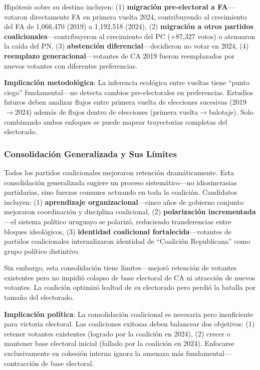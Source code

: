 Hipótesis sobre su destino incluyen: (1) \textbf{migración pre-electoral a FA}---votaron directamente FA en primera vuelta 2024, contribuyendo al crecimiento del FA de 1,066,470 (2019) a 1,192,518 (2024), (2) \textbf{migración a otros partidos coalicionales}---contribuyeron al crecimiento del PC (+87,327 votos) o atenuaron la caída del PN, (3) \textbf{abstención diferencial}---decidieron no votar en 2024, (4) \textbf{reemplazo generacional}---votantes de CA 2019 fueron reemplazados por nuevos votantes con diferentes preferencias.

\textbf{Implicación metodológica}: La inferencia ecológica entre vueltas tiene ``punto ciego'' fundamental---no detecta cambios pre-electorales en preferencias. Estudios futuros deben analizar flujos entre primera vuelta de elecciones sucesivas (2019$\to$2024) además de flujos dentro de elecciones (primera vuelta$\to$balotaje). Solo combinando ambos enfoques se puede mapear trayectorias completas del electorado.

\subsubsection{Consolidación Generalizada y Sus Límites}

Todos los partidos coalicionales mejoraron retención dramáticamente. Esta consolidación generalizada sugiere un proceso sistemático---no idiosincrasias partidarias, sino fuerzas comunes actuando en toda la coalición. Candidatos incluyen: (1) \textbf{aprendizaje organizacional}---cinco años de gobierno conjunto mejoraron coordinación y disciplina coalicional, (2) \textbf{polarización incrementada}---el sistema político uruguayo se polarizó, reduciendo transferencias entre bloques ideológicos, (3) \textbf{identidad coalicional fortalecida}---votantes de partidos coalicionales internalizaron identidad de ``Coalición Republicana'' como grupo político distintivo.

Sin embargo, esta consolidación tiene límites---mejoró retención de votantes existentes pero no impidió colapso de base electoral de CA ni atracción de nuevos votantes. La coalición optimizó lealtad de su electorado pero perdió la batalla por tamaño del electorado.

\textbf{Implicación política}: La consolidación coalicional es necesaria pero insuficiente para victoria electoral. Las coaliciones exitosas deben balancear dos objetivos: (1) retener votantes existentes (logrado por la coalición en 2024), (2) crecer o mantener base electoral inicial (fallado por la coalición en 2024). Enfocarse exclusivamente en cohesión interna ignora la amenaza más fundamental---contracción de base electoral.

